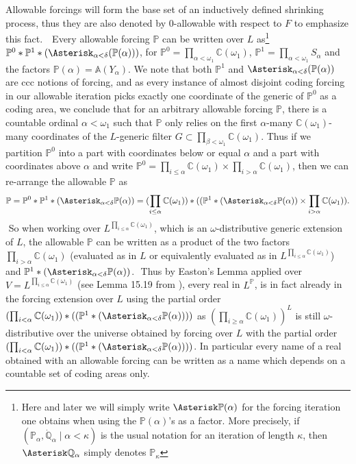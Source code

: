 \documentclass[a4paper,11pt]{article}
\newcommand{\forceP}{\mathbb{P}}
\newcommand{\forceQ}{\mathbb{Q}}
\begin{document}
Allowable forcings will form the base set of an inductively defined shrinking process, thus they are also denoted by 0-allowable with respect to $F$ to emphasize this fact.
    ﻿
    ﻿
    Every allowable forcing $\forceP$ can be written over $L$ as\footnote{Here and later we will simply write $\Asterisk \forceP(\alpha)$ for the forcing iteration one obtains when using the $\forceP(\alpha)$'s as a factor. More precisely, if $(\forceP_{\alpha} ,\dot{\forceQ}_{\alpha} \mid \alpha < \kappa )$ is the usual notation for an iteration of length $\kappa$, then $\Asterisk \forceQ_{\alpha}$ simply denotes $\forceP_{\kappa}$ } $\forceP^0 \ast \forceP^1 \ast (\Asterisk_{\alpha < \delta} ( \forceP(\alpha)))$, for $\forceP^0= \prod_{\alpha < \omega_1} \mathbb{C} (\omega_1)$, $\forceP^1= \prod_{\alpha < \omega_1} S_{\alpha}$ and the factors $\forceP({\alpha})=\mathbb{A} (Y_{\alpha})$.
    ﻿
    We note that both $\forceP^1$ and $\Asterisk_{\alpha < \delta} (\forceP(\alpha))$ are ccc notions of forcing, and as every instance of almost disjoint coding forcing in our allowable iteration picks exactly one coordinate of the generic of $\forceP^0$ as a coding area, we conclude that for an arbitrary allowable forcing $\forceP$, there is a countable ordinal $\alpha < \omega_1$ such that $\forceP$ only relies on the first $\alpha$-many $\mathbb{C} (\omega_1)$-many coordinates of the $L$-generic filter $G \subset \prod_{\beta < \omega_1} \mathbb{C} (\omega_1)$. Thus if we partition $\forceP^0$ into a part with coordinates below or equal $\alpha$ and a part with coordinates above $\alpha$ and write $\forceP^0= \prod_{i \le \alpha} \mathbb{C} (\omega_1) \times \prod_{i > \alpha} \mathbb{C} (\omega_1)$, then we can re-arrange the allowable $\forceP$ as
    ﻿
    \[ \forceP=\forceP^0 \ast \forceP^1 \ast (\Asterisk_{\alpha < \delta}  \forceP(\alpha))=
    (\prod_{i \le \alpha} \mathbb{C} (\omega_1) ) \ast( ( \forceP^1 \ast (\Asterisk_{\alpha < \delta}  \forceP(\alpha)) \times \prod_{i > \alpha} \mathbb{C} (\omega_1) ). \]
    ﻿
    So when working over $L^{\prod_{i \le \alpha} \mathbb{C} (\omega_1) }$, which is an $\omega$-distributive generic extension of $L$, the allowable $\forceP$ can be written as a product of the two factors $\prod_{i > \alpha} \mathbb{C} (\omega_1)$ (evaluated as in $L$ or equivalently evaluated as in $L^{\prod_{i \le \alpha} \mathbb{C} (\omega_1) }$) and $ \forceP^1 \ast (\Asterisk_{\alpha < \delta}  \forceP(\alpha))$.
    ﻿
    Thus by Easton's Lemma applied over $V=L^{\prod_{i \le \alpha} \mathbb{C} (\omega_1)}$ (see Lemma 15.19 from \cite{Jech}), every real in $L^{\forceP}$,  is in fact already in the forcing extension over $L$ using the partial order $(\prod_{i < \alpha} \mathbb{C} (\omega_1) ) \ast( ( \forceP^1 \ast (\Asterisk_{\alpha < \delta}  \forceP(\alpha))))$  as $(\prod_{i \ge \alpha} \mathbb{C} (\omega_1))^L$ is still $\omega$-distributive over the universe obtained by forcing over $L$ with the partial order $(\prod_{i < \alpha} \mathbb{C} (\omega_1) ) \ast( ( \forceP^1 \ast (\Asterisk_{\alpha < \delta}  \forceP(\alpha))))$. In particular every  name of a real obtained with an allowable forcing can be written as a name which depends on a countable set of coding areas only.
\end{document}
